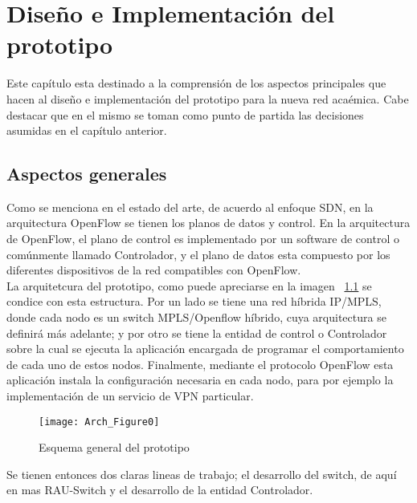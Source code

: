\chapter{Dise\~no e Implementaci\'on del prototipo}

\ifpdf
    \graphicspath{{Chapter4/Figs/Raster/}{Chapter4/Figs/PDF/}{Chapter4/Figs/}}
\else
    \graphicspath{{Chapter4/Figs/Vector/}{Chapter4/Figs/}}
\fi

Este cap\'itulo esta destinado a la comprensi\'on de los aspectos principales que hacen al dise\~no e implementaci\'on del prototipo para la nueva red aca\'emica. Cabe destacar que en el mismo se toman como punto de partida las decisiones asumidas en el cap\'itulo anterior.

\section{Aspectos generales}

Como se menciona en el estado del arte, de acuerdo al enfoque SDN, en la arquitectura OpenFlow se tienen los planos de datos y control. En la arquitectura de OpenFlow, el plano de control es implementado por un software de control o comúnmente llamado Controlador, y el plano de datos esta compuesto por los diferentes dispositivos de la red compatibles con OpenFlow.\\

La arquitetcura del prototipo, como puede apreciarse en la imagen ~\ref{fig:OpenSourceRArch0} se condice con esta estructura. Por un lado se tiene una red h\'ibrida IP/MPLS, donde cada nodo es un switch MPLS/Openflow híbrido, cuya arquitectura se definir\'a m\'as adelante; y por otro se tiene la entidad de control o Controlador sobre la cual se ejecuta la aplicaci\'on encargada de programar el comportamiento de cada uno de estos nodos. Finalmente, mediante el protocolo OpenFlow esta aplicaci\'on instala la configuraci\'on necesaria en cada nodo, para por ejemplo la implementaci\'on de un servicio de VPN particular.\\

\newpage
\begin{figure}[htbp!] 
\centering    
\texttt{[image: Arch\_Figure0]}
\caption[OpenSourceRArch0]{Esquema general del prototipo}
\label{fig:OpenSourceRArch0}
\end{figure}

Se tienen entonces dos claras lineas de trabajo; el desarrollo del switch, de aquí en mas RAU-Switch y el desarrollo de la entidad Controlador. 

